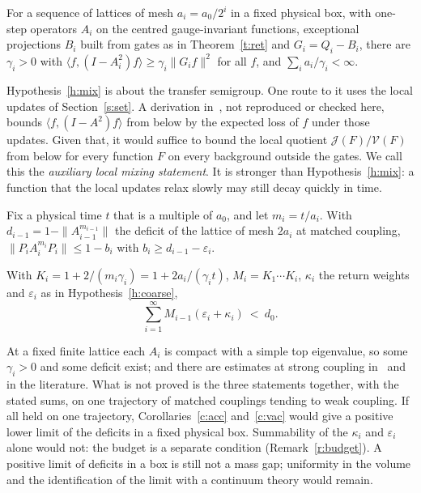\begin{hypothesis}\label{h:mix}
For a sequence of lattices of mesh $a_i=a_0/2^i$ in a fixed physical box, with one-step operators $A_i$ on the
centred gauge-invariant functions, exceptional projections $B_i$ built from gates as in Theorem~\ref{t:ret}
and $G_i=Q_i-B_i$, there are $\gamma_i>0$ with $\langle f,(I-A_i^2)f\rangle\ge\gamma_i\|G_if\|^2$ for all $f$, and
$\sum_ia_i/\gamma_i<\infty$.
\end{hypothesis}

Hypothesis~\ref{h:mix} is about the transfer semigroup. One route to it uses the local updates of
Section~\ref{s:set}. A derivation in~\cite{RepoInh}, not reproduced or checked here, bounds
$\langle f,(I-A^2)f\rangle$ from below by the expected loss of $f$ under those updates. Given that, it would
suffice to bound the local quotient $\mathcal J(F)/\mathcal V(F)$ from below for every function $F$ on every
background outside the gates. We call this the \emph{auxiliary local mixing statement}. It is stronger than
Hypothesis~\ref{h:mix}: a function that the local updates relax slowly may still decay quickly in time.

\begin{hypothesis}\label{h:coarse}
Fix a physical time $t$ that is a multiple of $a_0$, and let $m_i=t/a_i$. With $d_{i-1}=1-\|A_{i-1}^{m_{i-1}}\|$
the deficit of the lattice of mesh $2a_i$ at matched coupling, $\|P_iA_i^{m_i}P_i\|\le1-b_i$ with
$b_i\ge d_{i-1}-\varepsilon_i$.
\end{hypothesis}

\begin{hypothesis}\label{h:budget}
With $K_i=1+2/(m_i\gamma_i)=1+2a_i/(\gamma_it)$, $M_i=K_1\cdots K_i$, $\kappa_i$ the return weights and $\varepsilon_i$ as in
Hypothesis~\ref{h:coarse},
\[
\sum_{i=1}^\infty M_{i-1}(\varepsilon_i+\kappa_i)\ <\ d_0 .
\]
\end{hypothesis}

At a fixed finite lattice each $A_i$ is compact with a simple top eigenvalue, so some $\gamma_i>0$ and some
deficit exist; and there are estimates at strong coupling in~\cite{RepoInh} and in the literature. What is
not proved is the three statements together, with the stated sums, on one trajectory of matched couplings
tending to weak coupling. If all held on one trajectory, Corollaries~\ref{c:acc} and~\ref{c:vac} would give a positive lower limit of the deficits in a
fixed physical box. Summability of the $\kappa_i$ and $\varepsilon_i$ alone would not: the budget is a
separate condition (Remark~\ref{r:budget}). A positive limit of deficits in a box is still not a mass gap;
uniformity in the volume and the identification of the limit with a continuum theory would remain.


